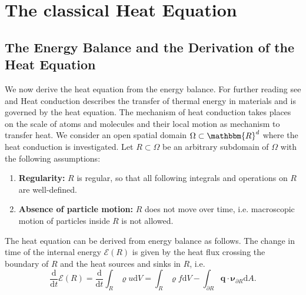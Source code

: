 \documentclass[a4paper,11pt]{article}
\theoremstyle{plain} %
\theoremstyle{definition} %
\theoremstyle{remark} %
\theoremstyle{remark}
\begin{document}
\pagestyle{main}

\begin{abstract}
This documentation presents numerical studies for the 2D heat conduction equation. The heat equation is solved using classical numerical methods, such as explicit Euler and implicit Crank-Nicolson, as well as Physics Informed Neural Networks (PINNs). Comparisons between these methods are provided, highlighting stability, accuracy, and computational efficiency.
\end{abstract}

\tableofcontents
\newpage

\section{The classical Heat Equation}
\subsection{The Energy Balance and the Derivation of the Heat Equation}
We now derive the heat equation from the energy balance. For further reading see \cite[pp 207]{eck2008modellierung} and \cite[pp 105]{hoffmann2014modellierung}
Heat conduction describes the transfer of thermal energy in materials and is governed by the heat equation. The mechanism of heat conduction takes places on the scale of atoms and molecules and their local motion as mechanism to transfer heat. 
We consider an open spatial domain $\Omega \subset \mathbbm{R}^d $ where the heat conduction is investigated. 
Let $R \subset \Omega $ be an arbitrary subdomain of $\Omega $ with the following assumptions:
\begin{enumerate}
\item \textbf{Regularity:} $R$ is regular, so that all following integrals and operations on $R$ are well-defined.
\item \textbf{Absence of particle motion:} $R$ does not move over time, i.e. macroscopic motion of particles inside $R$ is not allowed.
\end{enumerate}
The heat equation can be derived from energy balance as follows. The change in time of the internal energy $\mathscr{E}(R) $ is given by the heat flux crossing the boundary of $R$ and the heat sources and sinks in $R$, i.e.
\begin{equation*}
\frac{\mathrm{d}}{\mathrm{d}t} \mathscr{E} (R) = \frac{\mathrm{d}}{\mathrm{d}t} \int_R \varrho u \mathrm{d} V = \int_R \varrho f \mathrm{d} V - \int_{\partial R } \boldsymbol{q}\cdot \boldsymbol{\nu}_{\partial R} \mathrm{d} A .
\end{equation*}
\end{document}

